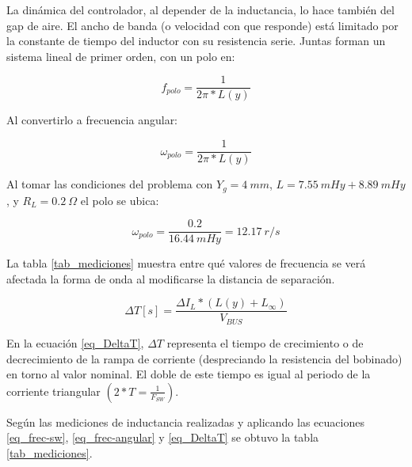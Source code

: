 \noindent La dinámica del controlador, al depender de la inductancia, lo hace también del gap de aire. El ancho de banda (o velocidad con que responde) está limitado por la constante de tiempo del inductor con su resistencia serie. Juntas forman un sistema lineal de primer orden, con un polo en:

\begin{equation} 
	f_{polo} = \frac{1}{2\pi * L(y)}
\end{equation}

\noindent Al convertirlo a frecuencia angular:

\begin{equation} \label{eq_frec-angular}
	\omega _{polo} = \frac{1}{2\pi * L(y)}
\end{equation}

\noindent Al tomar las condiciones del problema con $Y_g = 4\:mm$, $L = 7.55 \:mHy + 8.89 \:mHy$, y $R_L=0.2\:\Omega$ el polo se ubica:

\begin{equation} 
	\omega _{polo} = \frac{0.2}{16.44 \:mHy} = 12.17 \:r/s
\end{equation}

\noindent La tabla \ref{tab_mediciones} muestra  entre qué valores de frecuencia se verá afectada la forma de onda al modificarse la distancia de separación.

\begin{equation} \label{eq_DeltaT}
	\Delta T [s] = \frac{\Delta I_L * (L(y) + L_{\infty})}{V_{BUS}}
\end{equation}

\noindent En la ecuación \ref{eq_DeltaT}, $\Delta T$ representa el tiempo de crecimiento o de decrecimiento de la rampa de corriente (despreciando la resistencia del bobinado) en torno al valor nominal. El doble de este tiempo es igual al periodo de la corriente triangular $(2*T=\frac{1}{F_{SW}})$.

\noindent Según las mediciones de inductancia realizadas y aplicando las ecuaciones \ref{eq_frec-sw}, \ref{eq_frec-angular} y \ref{eq_DeltaT} se obtuvo la tabla \ref{tab_mediciones}.


